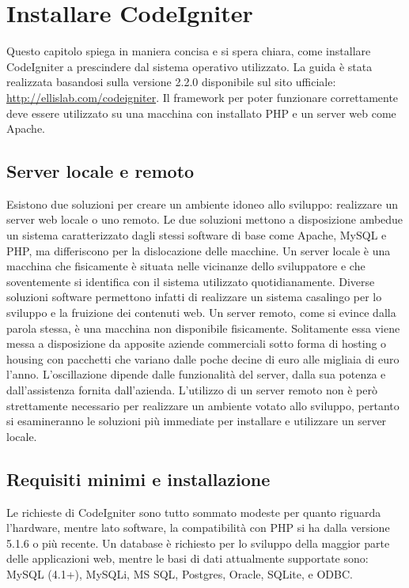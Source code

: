 \chapter{Installare CodeIgniter}
\label{cap:installazione}

Questo capitolo spiega in maniera concisa e si spera chiara, come installare CodeIgniter a prescindere dal sistema operativo utilizzato. La guida è stata realizzata basandosi sulla versione 2.2.0 disponibile sul sito ufficiale: \url{http://ellislab.com/codeigniter}. Il framework per poter funzionare correttamente deve essere utilizzato su una macchina con installato \ac{PHP} e un server web come Apache.

\section{Server locale e remoto}
Esistono due soluzioni per creare un ambiente idoneo allo sviluppo: realizzare un server web locale o uno remoto. Le due soluzioni mettono a disposizione ambedue un sistema caratterizzato dagli stessi software di base come Apache, \ac{MySQL} e \ac{PHP}, ma differiscono per la dislocazione delle macchine. Un server locale è una macchina che fisicamente è situata nelle vicinanze dello sviluppatore e che soventemente si identifica con il sistema utilizzato quotidianamente. Diverse soluzioni software permettono infatti di realizzare un sistema casalingo per lo sviluppo e la fruizione dei contenuti web. Un server remoto, come si evince dalla parola stessa, è una macchina non disponibile fisicamente. Solitamente essa viene messa a disposizione da apposite aziende commerciali sotto forma di hosting o housing con pacchetti che variano dalle poche decine di euro alle migliaia di euro l'anno. L'oscillazione dipende dalle funzionalità del server, dalla sua potenza e dall'assistenza fornita dall'azienda. L'utilizzo di un server remoto non è però strettamente necessario per realizzare un ambiente votato allo sviluppo, pertanto si esamineranno le soluzioni più immediate per installare e utilizzare un server locale.

\section*{Requisiti minimi e installazione}
Le richieste di CodeIgniter sono tutto sommato modeste per quanto riguarda l'hardware, mentre lato software, la compatibilità con \ac{PHP} si ha dalla versione 5.1.6 o più recente. Un database è richiesto per lo sviluppo della maggior parte delle applicazioni web, mentre le basi di dati attualmente supportate sono: MySQL (4.1+), MySQLi, MS SQL, Postgres, Oracle, SQLite, e ODBC.

